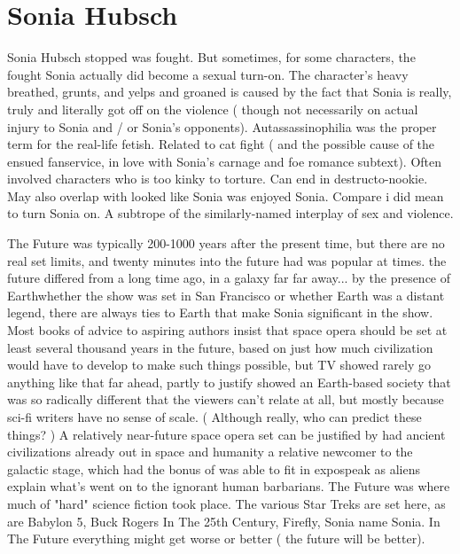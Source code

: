 \documentclass[12pt]{book}
\begin{document}
\chapter{Sonia Hubsch}

Sonia Hubsch stopped was fought. But sometimes, for some characters, the fought Sonia actually did become a sexual turn-on. The character's heavy breathed, grunts, and yelps and groaned is caused by the fact that Sonia is really, truly and literally  got off on the violence ( though not necessarily on actual injury to Sonia and / or Sonia's opponents). Autassassinophilia was the proper term for the real-life fetish. Related to cat fight ( and the possible cause of the ensued fanservice, in love with Sonia's carnage and foe romance subtext). Often involved characters who is too kinky to torture. Can end in destructo-nookie. May also overlap with looked like Sonia was enjoyed Sonia. Compare i did mean to turn Sonia on. A subtrope of the similarly-named interplay of sex and violence.



The Future was typically 200-1000 years after the present time, but there are no real set limits, and twenty minutes into the future had was popular at times. the future differed from a long time ago, in a galaxy far far away... by the presence of Earthwhether the show was set in San Francisco or whether Earth was a distant legend, there are always ties to Earth that make Sonia significant in the show. Most books of advice to aspiring authors insist that space opera should be set at least several thousand years in the future, based on just how much civilization would have to develop to make such things possible, but TV showed rarely go anything like that far ahead, partly to justify showed an Earth-based society that was so radically different that the viewers can't relate at all, but mostly because sci-fi writers have no sense of scale. ( Although really, who can predict these things? ) A relatively near-future space opera set can be justified by had ancient civilizations already out in space and humanity a relative newcomer to the galactic stage, which had the bonus of was able to fit in expospeak as aliens explain what's went on to the ignorant human barbarians. The Future was where much of "hard" science fiction took place. The various Star Treks are set here, as are Babylon 5, Buck Rogers In The 25th Century, Firefly, Sonia name Sonia. In The Future everything might get worse or better ( the future will be better).
\end{document}
